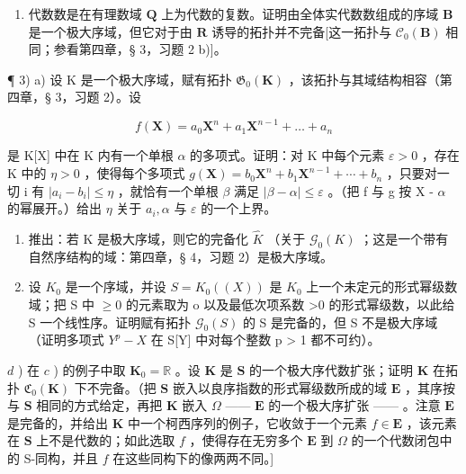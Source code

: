 \begin{enumerate}
\def\labelenumi{\arabic{enumi})}
\setcounter{enumi}{1}
\tightlist
\item
  代数数是在有理数域 \(\mathbf{Q}\) 上为代数的复数。证明由全体实代数数组成的序域 \(\mathbf{B}\) 是一个极大序域，但它对于由 \(\mathbf{R}\) 诱导的拓扑并不完备{[}这一拓扑与 \(\mathcal{C}_0(\mathbf{B})\) 相同；参看第四章，§ 3，习题 2 b){]}。
\end{enumerate}

¶ 3) a) 设 K 是一个极大序域，赋有拓扑 \(\mathfrak{G}_{0}(\mathbf{K})\) ，该拓扑与其域结构相容（第四章，§ 3，习题 2）。设

\[
f (\mathbf {X}) = a _ {0} \mathbf {X} ^ {n} + a _ {1} \mathbf {X} ^ {n - 1} + \dots + a _ {n}
\]

是 K{[}X{]} 中在 K 内有一个单根 \(\alpha\) 的多项式。证明：对 K 中每个元素 \(\varepsilon > 0\) ，存在 K 中的 \(\eta > 0\) ，使得每个多项式 \(g(\mathbf{X}) = b_{0}\mathbf{X}^{n} + b_{1}\mathbf{X}^{n-1} + \cdots + b_{n}\) ，只要对一切 i 有 \(|a_{i} - b_{i}| \leqslant \eta\) ，就恰有一个单根 \(\beta\) 满足 \(|\beta - \alpha| \leqslant \varepsilon\) 。（把 f 与 g 按 X - \(\alpha\) 的幂展开。）给出 \(\eta\) 关于 \(a_{i}, \alpha\) 与 \(\varepsilon\) 的一个上界。

\begin{enumerate}
\def\labelenumi{\alph{enumi})}
\setcounter{enumi}{1}
\item
  推出：若 K 是极大序域，则它的完备化 \(\hat{K}\) （关于 \(\mathcal{G}_{0}(K)\) ；这是一个带有自然序结构的域：第四章，§ 4，习题 2）是极大序域。
\item
  设 \(K_{0}\) 是一个序域，并设 \(S = K_{0}((X))\) 是 \(K_{0}\) 上一个未定元的形式幂级数域；把 S 中 \(\geqslant 0\) 的元素取为 o 以及最低次项系数 \textgreater0 的形式幂级数，以此给 S 一个线性序。证明赋有拓扑 \(\mathcal{G}_{0}(S)\) 的 S 是完备的，但 S 不是极大序域（证明多项式 \(Y^{p} - X\) 在 S{[}Y{]} 中对每个整数 p \textgreater{} 1 都不可约）。
\end{enumerate}

\(d\) ) 在 \(c\) ) 的例子中取 \(\mathbf{K}_0 = \mathbb{R}\) 。设 \(\mathbf{K}\) 是 \(\mathbf{S}\) 的一个极大序代数扩张；证明 \(\mathbf{K}\) 在拓扑 \(\mathfrak{C}_0(\mathbf{K})\) 下不完备。（把 \(\mathbf{S}\) 嵌入以良序指数的形式幂级数所成的域 \(\mathbf{E}\) ，其序按与 \(\mathbf{S}\) 相同的方式给定，再把 \(\mathbf{K}\) 嵌入 \(\Omega\) —— \(\mathbf{E}\) 的一个极大序扩张 —— 。注意 \(\mathbf{E}\) 是完备的，并给出 \(\mathbf{K}\) 中一个柯西序列的例子，它收敛于一个元素 \(f \in \mathbf{E}\) ，该元素在 \(\mathbf{S}\) 上不是代数的；如此选取 \(f\) ，使得存在无穷多个 \(\mathbf{E}\) 到 \(\Omega\) 的一个代数闭包中的 S-同构，并且 \(f\) 在这些同构下的像两两不同。{]}

